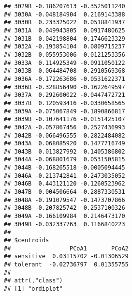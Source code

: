 \documentclass[
]{article}
\newenvironment{Shaded}{\begin{snugshade}}{\end{snugshade}}
\newcommand{\FloatTok}[1]{\textcolor[rgb]{0.00,0.00,0.81}{#1}}
\newcommand{\FunctionTok}[1]{\textcolor[rgb]{0.00,0.00,0.00}{#1}}
\newcommand{\NormalTok}[1]{#1}
\newcommand{\OtherTok}[1]{\textcolor[rgb]{0.56,0.35,0.01}{#1}}
\newcommand{\SpecialCharTok}[1]{\textcolor[rgb]{0.00,0.00,0.00}{#1}}
\newcommand{\StringTok}[1]{\textcolor[rgb]{0.31,0.60,0.02}{#1}}
\begin{document}
\begin{verbatim}
## 3029B -0.186207613 -0.3525011240
## 3030A -0.048184904  0.2169143388
## 3030B  0.233325022  0.0518841937
## 3031A  0.049943805  0.0917480625
## 3031B  0.042198804  0.1746623329
## 3032A -0.193854104  0.0809715237
## 3032B  0.055953006  0.0121253356
## 3033A  0.114925349 -0.0911050122
## 3033B  0.064484708 -0.2910569368
## 3036A -0.172263686 -0.0531622371
## 3036B -0.328856490 -0.1622649597
## 3037A  0.292600022 -0.0447472721
## 3037B  0.120593416 -0.0330658565
## 3039A -0.075067849 -0.1890866817
## 3039B -0.107641176 -0.0151425107
## 3042A -0.057867456  0.2527436993
## 3042B -0.066496555  0.2822484082
## 3043A  0.068085920  0.1477716749
## 3043B  0.013827992  0.1405386802
## 3044A -0.068801679  0.0531505815
## 3044B -0.168265518 -0.0005094445
## 3046A -0.213742841  0.2473035052
## 3046B  0.443121120 -0.1260523962
## 3047B  0.004506664 -0.2887330531
## 3048A -0.191079547 -0.1473707866
## 3048B -0.207825742  0.2537100326
## 3049A -0.166109984  0.2146473170
## 3049B -0.032337763  0.1166840223
## 
## $centroids
##                 PCoA1       PCoA2
## sensitive  0.03115702 -0.01306529
## tolerant  -0.02736797  0.01355755
## 
## attr(,"class")
## [1] "ordiplot"
\end{verbatim}

\begin{Shaded}
\end{Shaded}
\end{document}
